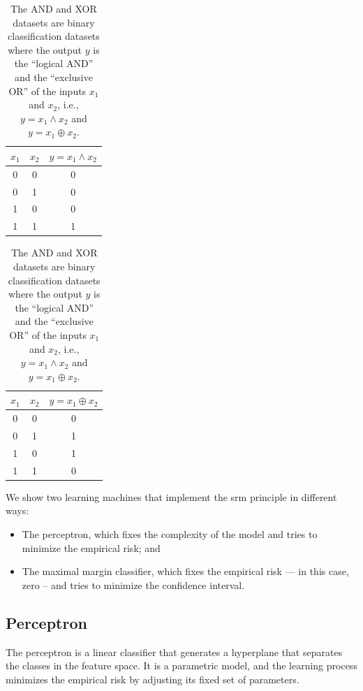 \begin{table}
  \centering
  \begin{minipage}{0.45\textwidth}
    \centering
    \begin{tabular}{ccc}
      \toprule
      $x_1$ & $x_2$ & $y = x_1 \land x_2$ \\
      \midrule
      0 & 0 & 0 \\
      0 & 1 & 0 \\
      1 & 0 & 0 \\
      1 & 1 & 1 \\
      \bottomrule
    \end{tabular}
  \end{minipage}
  \begin{minipage}{0.45\textwidth}
  \centering
  \begin{tabular}{ccc}
    \toprule
    $x_1$ & $x_2$ & $y = x_1 \oplus x_2$ \\
    \midrule
    0 & 0 & 0 \\
    0 & 1 & 1 \\
    1 & 0 & 1 \\
    1 & 1 & 0 \\
    \bottomrule
  \end{tabular}
  \end{minipage}
  \caption{
  The AND and XOR datasets are binary classification datasets where the output $y$ is the
  ``logical AND'' and the ``exclusive OR'' of the inputs $x_1$ and $x_2$, i.e.,
  $y = x_1 \land x_2$ and $y = x_1 \oplus x_2$.
  }
  \label{tab:and-xor}
\end{table}

We show two learning machines that implement the \gls{srm} principle in different ways:
\begin{itemize}
  \itemsep0em
  \item The perceptron, which fixes the complexity of the model and tries to minimize the
    empirical risk; and
  \item The maximal margin classifier, which fixes the empirical risk --- in this case,
    zero -- and tries to minimize the confidence interval.
\end{itemize}

\subsection{Perceptron}
\label{sub:perceptron}

The perceptron is a linear classifier that generates a hyperplane that separates the
classes in the feature space.  It is a parametric model, and the learning process minimizes the empirical risk
by adjusting its fixed set of parameters.

